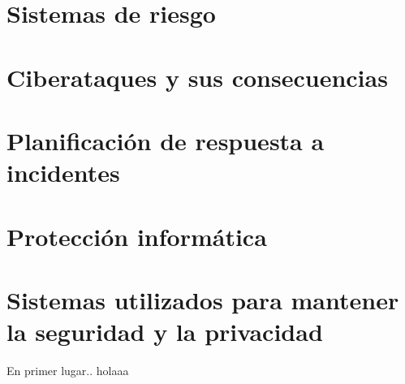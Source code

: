 \section{Sistemas de riesgo}
\label{sec:sistemas-de-riesgo}


\section{Ciberataques y sus consecuencias}
\label{sec:ciberataques-y-consecuencias}


\section{Planificación de respuesta a incidentes}
\label{sec:planificacion-de-respuesta}


\section{Protección informática}
\label{sec:proteccion-informatica}


\section{Sistemas utilizados para mantener la seguridad y la privacidad}
\label{sec: tipos-sistemas}

En primer lugar.\cite{rstudio}. holaaa










